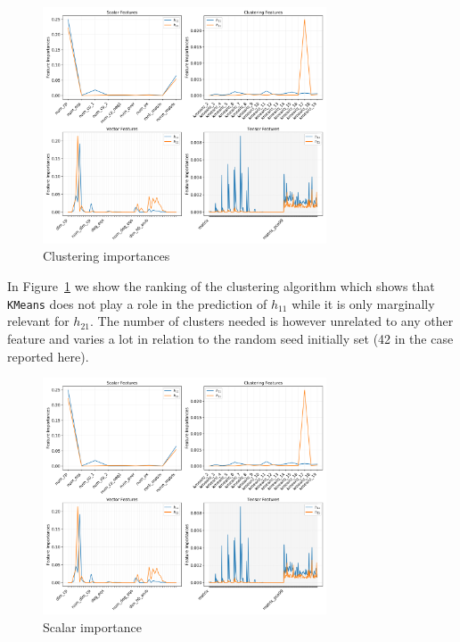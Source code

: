     \begin{figure}[!t]
        \centering
        \includegraphics[width=0.75\textwidth,
                         trim={6in 5in 0 0},
                         clip
                        ]{tex/img/feature_importances.png}
        \caption{Clustering importances}
        \label{fig:clustering_importances}
    \end{figure}
    
    In Figure~\ref{fig:clustering_importances} we show the ranking of the clustering algorithm which shows that \texttt{KMeans} does not play a role in the prediction of $h_{11}$ while it is only marginally relevant for $h_{21}$. The number of clusters needed is however unrelated to any other feature and varies a lot in relation to the random seed initially set (42 in the case reported here).
    
    \begin{figure}[!t]
        \centering
        \includegraphics[width=0.75\textwidth,
                         trim={0 5in 6in 0},
                         clip
                        ]{tex/img/feature_importances.png}
        \caption{Scalar importance}
        \label{fig:scalar_importances}
    \end{figure}
    
